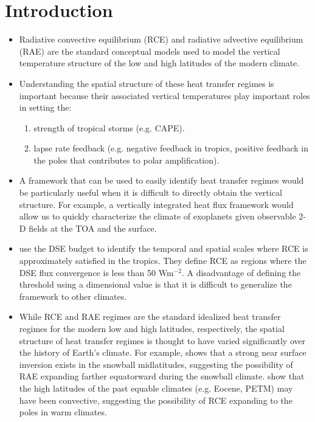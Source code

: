 \documentclass{ametsocV5}
\begin{document}
\section{Introduction}
\begin{itemize}
  \item Radiative convective equilibrium (RCE) and radiative advective equilibrium (RAE) are the standard conceptual models used to model the vertical temperature structure of the low and high latitudes of the modern climate.
  \item Understanding the spatial structure of these heat transfer regimes is important because their associated vertical temperatures play important roles in setting the:
        \begin{enumerate}
          \item strength of tropical storms (e.g. CAPE).
          \item lapse rate feedback (e.g. negative feedback in tropics, positive feedback in the poles that contributes to polar amplification).
        \end{enumerate}
  \item A framework that can be used to easily identify heat transfer regimes would be particularly useful when it is difficult to directly obtain the vertical structure. For example, a vertically integrated heat flux framework would allow us to quickly characterize the climate of exoplanets given observable 2-D fields at the TOA and the surface.
  \item \cite{jakob2019} use the DSE budget to identify the temporal and spatial scales where RCE is approximately satisfied in the tropics. They define RCE as regions where the DSE flux convergence is less than 50 Wm$^{-2}$. A disadvantage of defining the threshold using a dimensional value is that it is difficult to generalize the framework to other climates.
  \item While RCE and RAE regimes are the standard idealized heat transfer regimes for the modern low and high latitudes, respectively, the spatial structure of heat transfer regimes is thought to have varied significantly over the history of Earth's climate. For example, \cite{pierrehumbert2005} shows that a strong near surface inversion exists in the snowball midlatitudes, suggesting the possibility of RAE expanding farther equatorward during the snowball climate. \cite{abbot2008} show that the high latitudes of the past equable climates (e.g. Eocene, PETM) may have been convective, suggesting the possibility of RCE expanding to the poles in warm climates.

\end{itemize}
\end{document}
